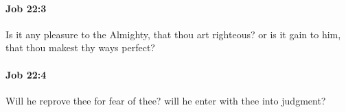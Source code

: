 		\paragraph{Job 22:3} %
			\label{JOB-22-3}

			Is it any pleasure to the Almighty, that thou art righteous? or is it gain to him, that thou makest thy ways perfect?


		\paragraph{Job 22:4} %
			\label{JOB-22-4}

			Will he reprove thee for fear of thee? will he enter with thee into judgment?


